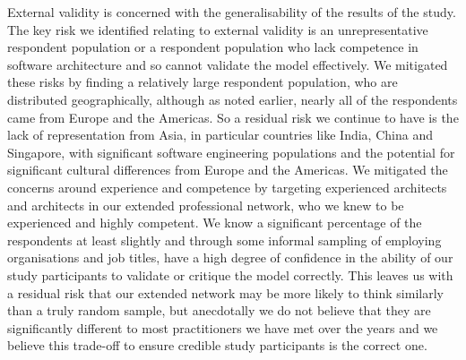 External validity is concerned with the generalisability of the results of the study.  The key risk we identified relating to external validity is an unrepresentative respondent population or a respondent population who lack competence in software architecture and so cannot validate the model effectively.  We mitigated these risks by finding a relatively large respondent population, who are distributed geographically, although as noted earlier, nearly all of the respondents came from Europe and the Americas.  So a residual risk we continue to have is the lack of representation from Asia, in particular countries like India, China and Singapore, with significant software engineering populations and the potential for significant cultural differences from Europe and the Americas.  We mitigated the concerns around experience and competence by targeting experienced architects and architects in our extended professional network, who we knew to be experienced and highly competent.  We know a significant percentage of the respondents at least slightly and through some informal sampling of employing organisations and job titles, have a high degree of confidence in the ability of our study participants to validate or critique the model correctly.  This leaves us with a residual risk that our extended network may be more likely to think similarly than a truly random sample, but anecdotally we do not believe that they are significantly different to most practitioners we have met over the years and we believe this trade-off to ensure credible study participants is the correct one.

